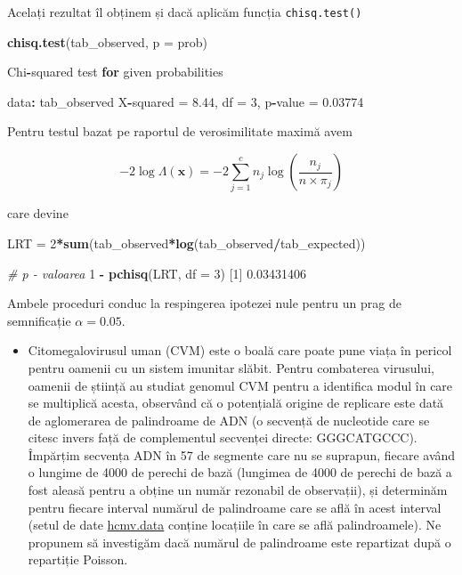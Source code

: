 \documentclass[]{article}
\newenvironment{Shaded}{\begin{snugshade}}{\end{snugshade}}
\newcommand{\KeywordTok}[1]{\textcolor[rgb]{0.13,0.29,0.53}{\textbf{#1}}}
\newcommand{\DataTypeTok}[1]{\textcolor[rgb]{0.13,0.29,0.53}{#1}}
\newcommand{\DecValTok}[1]{\textcolor[rgb]{0.00,0.00,0.81}{#1}}
\newcommand{\FloatTok}[1]{\textcolor[rgb]{0.00,0.00,0.81}{#1}}
\newcommand{\StringTok}[1]{\textcolor[rgb]{0.31,0.60,0.02}{#1}}
\newcommand{\CommentTok}[1]{\textcolor[rgb]{0.56,0.35,0.01}{\textit{#1}}}
\newcommand{\ControlFlowTok}[1]{\textcolor[rgb]{0.13,0.29,0.53}{\textbf{#1}}}
\newcommand{\OperatorTok}[1]{\textcolor[rgb]{0.81,0.36,0.00}{\textbf{#1}}}
\newcommand{\NormalTok}[1]{#1}
\newenvironment{frshaded*}{%
  \def\FrameCommand{\fboxrule=\FrameRule\fboxsep=\FrameSep \fcolorbox{framecolor}{shadecolor1}}%
  \MakeFramed {\advance\hsize-\width \FrameRestore}}%
{\endMakeFramed}
\newenvironment{rmdblock}[1]
  {\begin{frshaded*}
  \begin{itemize}
  \renewcommand{\labelitemi}{
    \raisebox{-.7\height}[0pt][0pt]{
      {\setkeys{Gin}{width=2em,keepaspectratio}\texttt{[image: images/icons/\#1]}}
    }
  }
  \item
  }
  {
  \end{itemize}
  \end{frshaded*}
  }
\newenvironment{rmdexercise}
  {\begin{rmdblock}{exercise}}
  {\end{rmdblock}}
\begin{document}
Acelați rezultat îl obținem și dacă aplicăm funcția
\texttt{chisq.test()}

\begin{Shaded}
\begin{Highlighting}[]
\KeywordTok{chisq.test}\NormalTok{(tab_observed, }\DataTypeTok{p =}\NormalTok{ prob)}

\NormalTok{    Chi}\OperatorTok{-}\NormalTok{squared test }\ControlFlowTok{for}\NormalTok{ given probabilities}

\NormalTok{data}\OperatorTok{:}\StringTok{  }\NormalTok{tab_observed}
\NormalTok{X}\OperatorTok{-}\NormalTok{squared =}\StringTok{ }\FloatTok{8.44}\NormalTok{, df =}\StringTok{ }\DecValTok{3}\NormalTok{, p}\OperatorTok{-}\NormalTok{value =}\StringTok{ }\FloatTok{0.03774}
\end{Highlighting}
\end{Shaded}

Pentru testul bazat pe raportul de verosimilitate maximă avem

\[
  -2\log \Lambda(\mathbf{x}) = -2\sum_{j = 1}^{c} n_{j}\log\left(\frac{n_{j}}{n\times \pi_{j}}\right)
\]

care devine

\begin{Shaded}
\begin{Highlighting}[]
\NormalTok{LRT =}\StringTok{ }\DecValTok{2}\OperatorTok{*}\KeywordTok{sum}\NormalTok{(tab_observed}\OperatorTok{*}\KeywordTok{log}\NormalTok{(tab_observed}\OperatorTok{/}\NormalTok{tab_expected))}

\CommentTok{# p - valoarea}
\DecValTok{1} \OperatorTok{-}\StringTok{ }\KeywordTok{pchisq}\NormalTok{(LRT, }\DataTypeTok{df =} \DecValTok{3}\NormalTok{)}
\NormalTok{[}\DecValTok{1}\NormalTok{] }\FloatTok{0.03431406}
\end{Highlighting}
\end{Shaded}

Ambele proceduri conduc la respingerea ipotezei nule pentru un prag de
semnificație \(\alpha = 0.05\).

\begin{rmdexercise}
Citomegalovirusul uman (CVM) este o boală care poate pune viața în
pericol pentru oamenii cu un sistem imunitar slăbit. Pentru combaterea
virusului, oamenii de știință au studiat genomul CVM pentru a identifica
modul în care se multiplică acesta, observând că o potențială origine de
replicare este dată de aglomerarea de palindroame de ADN (o secvență de
nucleotide care se citesc invers față de complementul secvenței directe:
GGGCATGCCC). Împărțim secvența ADN în 57 de segmente care nu se
suprapun, fiecare având o lungime de 4000 de perechi de bază (lungimea
de 4000 de perechi de bază a fost aleasă pentru a obține un număr
rezonabil de observații), și determinăm pentru fiecare interval numărul
de palindroame care se află în acest interval (setul de date
\href{dataIn/hcmv.data}{hcmv.data} conține locațiile în care se află
palindroamele). Ne propunem să investigăm dacă numărul de palindroame
este repartizat după o repartiție Poisson.
\end{rmdexercise}
\end{document}
